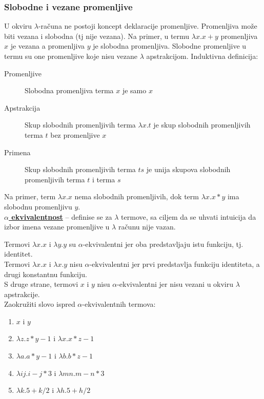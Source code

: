 \documentclass[../main.tex]{subfiles}
\begin{document}
\subsubsection{Slobodne i vezane promenljive}				%

U okviru $\lambda$-računa ne postoji koncept deklaracije promenljive. Promenljiva može biti vezana i slobodna (tj nije vezana). Na primer, u termu $\lambda x.x+y$ promenljiva $x$ je vezana a promenljiva $y$ je slobodna promenljiva. Slobodne promenljive u termu su one promenljive koje nisu vezane $\lambda$ apstrakcijom. Induktivna definicija:
\begin{description}
\item[Promenljive] Slobodna promenljiva terma $x$ je samo $x$
\item[Apstrakcija] Skup slobodnih promenljivih terma $\lambda x.t$ je skup slobodnih promenljivih terma $t$ bez promenljive $x$
\item[Primena] Skup slobodnih promenljivih terma $ts$ je unija skupova slobodnih promenljivih terma $t$ i terma $s$
\end{description}
Na primer, term $\lambda x.x$ nema slobodnih promenljivih, dok term $\lambda x.x*y$ ima slobodnu promenljivu $y$.
\\
\underline{\bf $\alpha$ ekvivalentnost} -- definise se za $\lambda$ termove, sa ciljem da se uhvati intuicija da izbor imena vezane promenljive u $\lambda$ računu nije vazan.
\begin{boxprimer}
Termovi $\lambda x.x$ i $\lambda y.y$ su $\alpha$-ekvivalentni jer oba predstavljaju istu funkciju, tj. identitet.\\
Termovi $\lambda x.x$ i $\lambda x.y$ nisu $\alpha$-ekvivalentni jer prvi predstavlja funkciju identiteta, a drugi konstantnu funkciju.\\
S druge strane, termovi $x$ i $y$ nisu $\alpha$-ekvivalentni jer nisu vezani u okviru $\lambda$ apstrakcije.
\\
Zaokružiti slovo ispred $\alpha$-ekvivalentnih termova:
\begin{enumerate}[label=(\alph*)]
\item $x$ i $y$
\item $\lambda z.z*y-1$ i $\lambda x.x*z-1$
\item $\lambda a.a*y-1$ i $\lambda b.b*z-1$
\item $\lambda ij.i-j*3$ i $\lambda mn.m-n*3$
\item $\lambda k.5 + k/2$ i $\lambda h.5 + h/2$
\end{enumerate}
\end{boxprimer}
\end{document}
